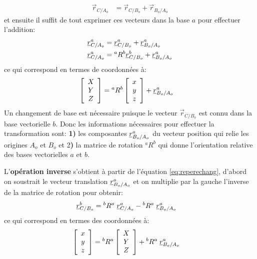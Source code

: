 \begin{align}
	\vec{r}_{C/A_o}   &= \vec{r}_{C/B_o}  + \vec{r}_{B_o/A_o}
\end{align}
et ensuite il suffit de tout exprimer ces vecteurs dans la base $a$ pour effectuer l'addition:
\begin{align}
	\underline{r}_{C/A_o}^a &=         \underline{r}_{C/B_o}^a  + \underline{r}_{B_o/A_o}^a  \\
	\underline{r}_{C/A_o}^a &= {}^aR^b \underline{r}_{C/B_o}^b  + \underline{r}_{B_o/A_o}^a
	\label{eq:reperechang}
\end{align}
ce qui correspond en termes de coordonnées à:
\begin{align}
	\left[ \begin{array}{c}
			   X \\ Y \\ Z
	\end{array} \right]  &=
	{}^aR^b
	\left[ \begin{array}{c}
			   x \\ y \\ z
	\end{array} \right] + \underline{r}_{B_o/A_o}^a
\end{align}
Un changement de base est nécessaire puisque le vecteur $\vec{r}_{C/B_o}$ est connu dans la base vectorielle $b$. Donc les informations nécessaires pour effectuer la transformation sont: \textbf{1)} les composantes $\underline{r}_{B_o/A_o}^a$ du vecteur position qui relie les origines $A_o$ et $B_o$ et 2\textbf{)} la matrice de rotation $^aR^b$ qui donne l'orientation relative des bases vectorielles $a$ et $b$.

L'\textbf{opération inverse} s'obtient à partir de l'équation \eqref{eq:reperechang}, d'abord on soustrait le vecteur translation $\underline{r}_{B_o/A_o}^a$ et on multiplie par la gauche l'inverse de la matrice de rotation pour obtenir:
\begin{align}
	\underline{r}_{C/B_o}^b &= {}^bR^a \; \underline{r}_{C/A_o}^a - {}^bR^a \; \underline{r}_{B_o/A_o}^a
	\label{eq:reperechanginv}
\end{align}
ce qui correspond en termes des coordonnées à:
\begin{align}
	\left[ \begin{array}{c}
			   x \\ y \\ z
	\end{array} \right]  &=
	{}^bR^a
	\left[ \begin{array}{c}
			   X \\ Y \\ Z
	\end{array} \right] + {}^bR^a \; \underline{r}_{B_o/A_o}^a
\end{align}




